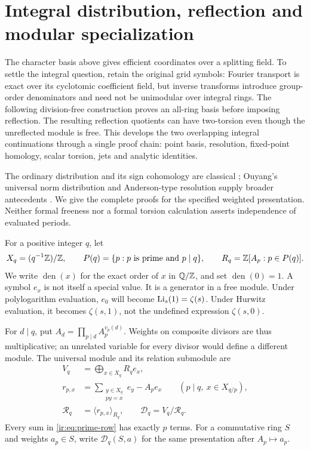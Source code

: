 \section{Integral distribution, reflection and modular specialization}
\label{ir:sec:scope}
The character basis above gives efficient coordinates over a splitting
field. To settle the integral question, retain the original grid symbols:
Fourier transport is exact over its cyclotomic coefficient field, but
inverse transforms introduce group-order denominators and need not be
unimodular over integral rings. The following division-free construction
proves an all-ring basis before imposing reflection. The resulting
reflection quotients can have two-torsion even though the unreflected
module is free. This develops the two overlapping integral continuations
through a single proof chain: point basis, resolution, fixed-point
homology, scalar torsion, jets and analytic identities.

The ordinary distribution and its sign cohomology are classical
\cite{dist:Kubert,intdist:KubertSign}; Ouyang's universal norm distribution
and Anderson-type resolution supply broader antecedents
\cite{dist:Ouyang}. We give the complete proofs for the specified weighted
presentation. Neither formal freeness nor a formal torsion calculation
asserts independence of evaluated periods.
\newcommand{\intdistL}[2]{\mathcal L_{#1}(#2)}
\newcommand{\intdistJ}[2]{\mathcal L^{[#1]}(#2)}

For a positive integer $q$, let
\[
 X_q=(q^{-1}\mathbb{Z})/\mathbb{Z},\qquad P(q)=\{p:p\text{ is prime and }p\mid q\},
 \qquad R_q=\mathbb{Z}[A_p:p\in P(q)].
\]
We write $\operatorname{den}(x)$ for the exact order of $x$ in $\mathbb{Q}/\mathbb{Z}$, and set
$\operatorname{den}(0)=1$. A symbol $e_x$ is not itself a special value. It is a generator
in a free module. Under polylogarithm evaluation, $e_0$ will become
$\operatorname{Li}_s(1)=\zeta(s)$. Under Hurwitz evaluation, it becomes
$\zeta(s,1)$, not the undefined expression $\zeta(s,0)$.

For $d\mid q$, put $A_d=\prod_{p\mid d}A_p^{v_p(d)}$.
Weights on composite divisors are thus multiplicative; an unrelated
variable for every divisor would define a different module. The universal
module and its relation submodule are
\begin{align}
 V_q&=\bigoplus_{x\in X_q}R_qe_x,\\
 r_{p,x}&=\sum_{\substack{y\in X_q\\py=x}}e_y-A_pe_x
       \qquad(p\mid q,\ x\in X_{q/p}),\label{ir:eq:prime-row}\\
 \mathcal R_q&=\langle r_{p,x}\rangle_{R_q},\qquad
 \mathcal D_q=V_q/\mathcal R_q.\label{ir:eq:module}
\end{align}
Every sum in \eqref{ir:eq:prime-row} has exactly $p$ terms. For a
commutative ring $S$ and weights $a_p\in S$, write $\mathcal D_q(S,a)$ for the
same presentation after $A_p\mapsto a_p$.

